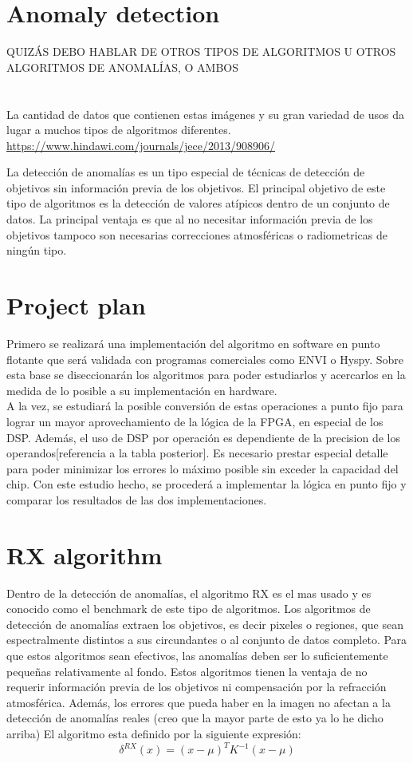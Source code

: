 \section{Anomaly detection}
QUIZÁS DEBO HABLAR DE OTROS TIPOS DE ALGORITMOS U OTROS ALGORITMOS DE ANOMALÍAS, O AMBOS
\\
\\
\\

La cantidad de datos que contienen estas imágenes y su gran variedad de usos da lugar a muchos tipos de algoritmos diferentes.
\\
\url{https://www.hindawi.com/journals/jece/2013/908906/}

La detección de anomalías es un tipo especial de técnicas de detección de objetivos sin información previa de los objetivos. El principal objetivo de este tipo de algoritmos es la detección de valores atípicos dentro de un conjunto de datos. La principal ventaja es que al no necesitar información previa de los objetivos tampoco son necesarias correcciones atmosféricas o radiometricas de ningún tipo.


\section{Project plan}
Primero se realizará una implementación del algoritmo en software en punto flotante que será validada con programas comerciales como ENVI o Hyspy. Sobre esta base se diseccionarán los algoritmos para poder estudiarlos y acercarlos en la medida de lo posible a su implementación en hardware.
\\
A la vez, se estudiará la posible conversión de estas operaciones a punto fijo para lograr un mayor aprovechamiento de la lógica de la FPGA, en especial de los DSP. Además, el uso de DSP por operación es dependiente de la precision de los operandos[referencia a la tabla posterior]. Es necesario prestar especial detalle para poder minimizar los errores lo máximo posible sin exceder la capacidad del chip. Con este estudio hecho, se procederá a implementar la lógica en punto fijo y comparar los resultados de las dos implementaciones.


\section{RX algorithm}
Dentro de la detección de anomalías, el algoritmo RX es el mas usado y es conocido como el benchmark de este tipo de algoritmos.
Los algoritmos de detección de anomalías extraen los objetivos, es decir pixeles o regiones, que sean espectralmente distintos a sus circundantes o al conjunto de datos completo. Para que estos algoritmos sean efectivos, las anomalías deben ser lo suficientemente pequeñas relativamente al fondo. Estos algoritmos tienen la ventaja de no requerir información previa de los objetivos ni compensación por la refracción atmosférica. Además, los errores que pueda haber en la imagen no afectan a la detección de anomalías reales (creo que la mayor parte de esto ya lo he dicho arriba)
\bigskip
El algoritmo esta definido por la siguiente expresión:
\\
\[\delta ^{RX}(x) = (x-\mu)^{T}K^{-1}(x-\mu)\]

